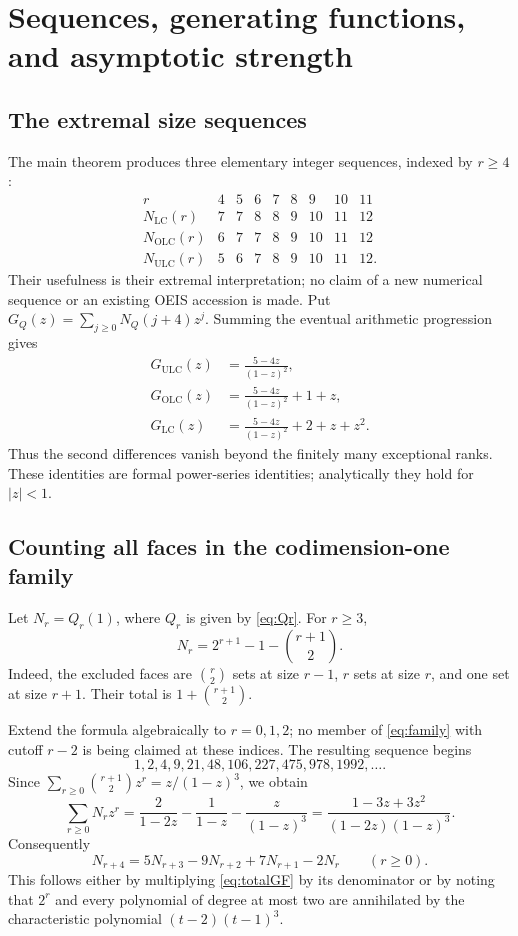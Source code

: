 \documentclass[11pt,letterpaper]{article}
\numberwithin{equation}{section}
\theoremstyle{definition}
\theoremstyle{remark}
\newcommand{\LC}{\mathrm{LC}}
\newcommand{\OLC}{\mathrm{OLC}}
\newcommand{\ULC}{\mathrm{ULC}}
\begin{document}
\section{Sequences, generating functions, and asymptotic strength}
\label{sec:sequences}

\subsection{The extremal size sequences}
The main theorem produces three elementary integer sequences, indexed by
$r\ge4$:
\[
\begin{array}{c|rrrrrrrr}
 r&4&5&6&7&8&9&10&11\\\hline
 N_{\LC}(r)&7&7&8&8&9&10&11&12\\
 N_{\OLC}(r)&6&7&7&8&9&10&11&12\\
 N_{\ULC}(r)&5&6&7&8&9&10&11&12.
\end{array}
\]
Their usefulness is their extremal interpretation; no claim of a new
numerical sequence or an existing OEIS accession is made.
Put $G_Q(z)=\sum_{j\ge0}N_Q(j+4)z^j$. Summing the eventual arithmetic
progression gives
\begin{align}
 G_{\ULC}(z)&=\frac{5-4z}{(1-z)^2},\label{eq:minGF}\\
 G_{\OLC}(z)&=\frac{5-4z}{(1-z)^2}+1+z,\\
 G_{\LC}(z)&=\frac{5-4z}{(1-z)^2}+2+z+z^2.
\end{align}
Thus the second differences vanish beyond the finitely many exceptional
ranks. These identities are formal power-series identities; analytically
they hold for $|z|<1$.

\subsection{Counting all faces in the codimension-one family}
Let $N_r=Q_r(1)$, where $Q_r$ is given by \eqref{eq:Qr}. For $r\ge3$,
\begin{equation}\label{eq:Nr}
 N_r=2^{r+1}-1-\binom{r+1}{2}.
\end{equation}
Indeed, the excluded faces are $\binom r2$ sets at size $r-1$, $r$ sets
at size $r$, and one set at size $r+1$. Their total is
$1+\binom{r+1}{2}$.

Extend the formula algebraically to $r=0,1,2$; no member of
\eqref{eq:family} with cutoff $r-2$ is being claimed at these indices.
The resulting sequence begins
\[
 1,2,4,9,21,48,106,227,475,978,1992,\ldots.
\]
Since $\sum_{r\ge0}\binom{r+1}{2}z^r=z/(1-z)^3$, we obtain
\begin{equation}\label{eq:totalGF}
 \sum_{r\ge0}N_rz^r
 =\frac2{1-2z}-\frac1{1-z}-\frac{z}{(1-z)^3}
 =\frac{1-3z+3z^2}{(1-2z)(1-z)^3}.
\end{equation}
Consequently
\begin{equation}\label{eq:recurrence}
 N_{r+4}=5N_{r+3}-9N_{r+2}+7N_{r+1}-2N_r\qquad(r\ge0).
\end{equation}
This follows either by multiplying \eqref{eq:totalGF} by its denominator
or by noting that $2^r$ and every polynomial of degree at most two are
annihilated by the characteristic polynomial
$(t-2)(t-1)^3$.
\end{document}
